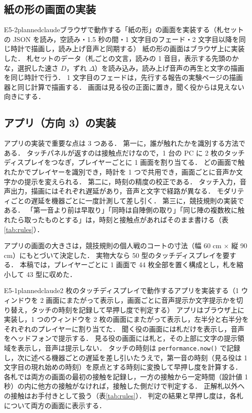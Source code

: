 \subsection{紙の形の画面の実装}

\begin{fd}{E5-2}{planned}{claude}{ブラウザで動作する「紙の形」の画面を実装する（札セットの JSON を読み，空読み・1.5 秒の間・1 文字目のフェード・2 文字目以降を同じ時計で描画し，読み上げ音声と同期する）}
紙の形の画面はブラウザ上に実装した．
札セットのデータ（札ごとの文言，読みの 1 音目，表示する先頭のかな，選択した速さ $D$，ずれ $\Delta$）を読み込み，読み上げ音声の再生と文字の描画を同じ時計で行う．
1 文字目のフェードは，先行する報告の実験ページの描画器と同じ計算で描画する．
画面は見る役の正面に置き，聞く役からは見えない向きにする．
\end{fd}

\subsection{アプリ（方向 3）の実装}

アプリの実装で重要な点は 3 つある．
第一に，誰が触れたかを識別する方法である．
タッチパネルが返すのは接触点だけなので，1 台の PC に 2 枚のタッチディスプレイをつなぎ，プレイヤーごとに 1 画面を割り当てる．
どの画面で触れたかでプレイヤーを識別でき，時計を 1 つで共用でき，画面ごとに音声か文字かの提示を変えられる．
第二に，時刻の精度の校正である．
タッチ入力，音声出力，描画にはそれぞれ遅延があり，音声と文字で経路が異なる．
モダリティごとの遅延を機器ごとに一度計測して差し引く．
第三に，競技規則の実装である．
「第一音より前は早取り」「同時は自陣側の取り」「同じ陣の複数枚に触れたら取ったものとする」は，時刻と接触点があればそのまま書ける（表\ref{tab:rules}）．

アプリの画面の大きさは，競技規則の個人戦のコートの寸法（幅 60 cm × 縦 90 cm）にもとづいて決定した．
実物大なら 50 型のタッチディスプレイを要する．
本稿では，プレイヤーごとに 1 画面で 44 枚全部を置く構成とし，札を縮小して 43 型に収めた．

\begin{fd}{E5-1}{planned}{claude}{2 枚のタッチディスプレイで動作するアプリを実装する（1 ウィンドウを 2 画面にまたがって表示し，画面ごとに音声提示か文字提示かを切り替え，タッチの時刻を記録して早押し度で判定する）}
アプリはブラウザ上に実装し，1 つのウィンドウを 2 枚の画面にまたがって表示し，左半分と右半分をそれぞれのプレイヤーに割り当てた．
聞く役の画面には札だけを表示し，音声をヘッドフォンで提示する．
見る役の画面には札と，その上部に文字の提示領域を表示し，音声は提示しない．
タッチの時刻は \texttt{performance.now()} で記録し，次に述べる機器ごとの遅延を差し引いたうえで，第一音の時刻（見る役は 1 文字目の現れ始めの時刻）を原点とする時刻に変換して早押し度を計算する．
各札では両方の画面の最初の接触を記録し，一方の接触から一定時間（設計値 1 秒）の内に他方の接触がなければ，接触した側だけで判定する．
正解札以外への接触はお手付きとして扱う（表\ref{tab:rules}）．
判定の結果と早押し度は，各札について両方の画面に表示する．
\end{fd}

